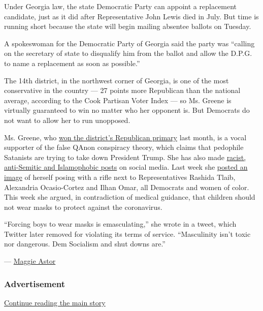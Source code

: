 Under Georgia law, the state Democratic Party can appoint a replacement
candidate, just as it did after Representative John Lewis died in July.
But time is running short because the state will begin mailing absentee
ballots on Tuesday.

A spokeswoman for the Democratic Party of Georgia said the party was
``calling on the secretary of state to disqualify him from the ballot
and allow the D.P.G. to name a replacement as soon as possible.''

The 14th district, in the northwest corner of Georgia, is one of the
most conservative in the country --- 27 points more Republican than the
national average, according to the Cook Partisan Voter Index --- so Ms.
Greene is virtually guaranteed to win no matter who her opponent is. But
Democrats do not want to allow her to run unopposed.

Ms. Greene, who
\href{https://www.nytimes3xbfgragh.onion/2020/08/11/us/politics/marjorie-taylor-greene-qanon-georgia-primary.html}{won
the district's Republican primary} last month, is a vocal supporter of
the false QAnon conspiracy theory, which claims that pedophile Satanists
are trying to take down President Trump. She has also made
\href{https://www.nytimes3xbfgragh.onion/2020/06/17/us/marjorie-taylor-greene-georgia.html}{racist,
anti-Semitic and Islamophobic posts} on social media. Last week she
\href{https://www.nytimes3xbfgragh.onion/aponline/2020/09/04/us/ap-us-election-2020-georgia-14th.html}{posted
an image} of herself posing with a rifle next to Representatives Rashida
Tlaib, Alexandria Ocasio-Cortez and Ilhan Omar, all Democrats and women
of color. This week she argued, in contradiction of medical guidance,
that children should not wear masks to protect against the coronavirus.

``Forcing boys to wear masks is emasculating,'' she wrote in a tweet,
which Twitter later removed for violating its terms of service.
``Masculinity isn't toxic nor dangerous. Dem Socialism and shut downs
are.''

--- \href{https://www.nytimes3xbfgragh.onion/by/maggie-astor}{Maggie
Astor}

\hypertarget{advertisement-2}{%
\subsubsection{Advertisement}\label{advertisement-2}}

\protect\hyperlink{after-dfp-ad-mid3}{Continue reading the main story}

